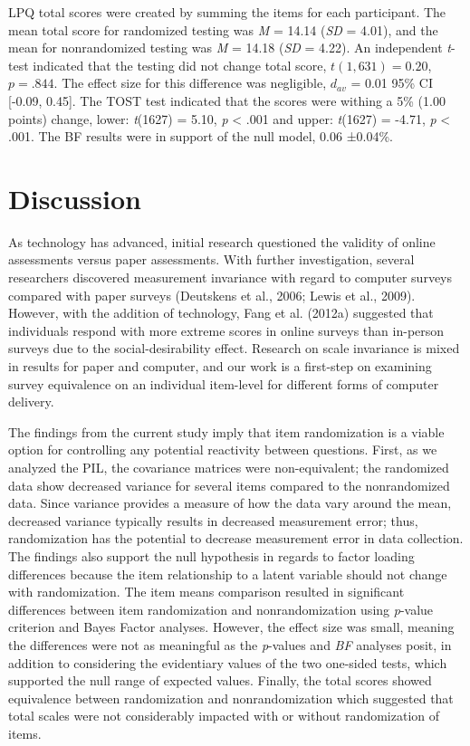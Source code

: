 \documentclass[english,man, mask]{apa6}
\theoremstyle{definition}
\theoremstyle{definition}
\theoremstyle{definition}
\theoremstyle{remark}
\begin{document}
LPQ total scores were created by summing the items for each participant.
The mean total score for randomized testing was \emph{M} = 14.14
(\emph{SD} = 4.01), and the mean for nonrandomized testing was \emph{M}
= 14.18 (\emph{SD} = 4.22). An independent \emph{t}-test indicated that
the testing did not change total score, \(t(1,631) = 0.20\),
\(p = .844\). The effect size for this difference was negligible,
\(d_{av}\) = 0.01 95\% CI {[}-0.09, 0.45{]}. The TOST test indicated
that the scores were withing a 5\% (1.00 points) change, lower:
\emph{t}(1627) = 5.10, \emph{p} \textless{} .001 and upper:
\emph{t}(1627) = -4.71, \emph{p} \textless{} .001. The BF results were
in support of the null model, 0.06 ±0.04\%.

\section{Discussion}\label{discussion}

As technology has advanced, initial research questioned the validity of
online assessments versus paper assessments. With further investigation,
several researchers discovered measurement invariance with regard to
computer surveys compared with paper surveys (Deutskens et al., 2006;
Lewis et al., 2009). However, with the addition of technology, Fang et
al. (2012a) suggested that individuals respond with more extreme scores
in online surveys than in-person surveys due to the social-desirability
effect. Research on scale invariance is mixed in results for paper and
computer, and our work is a first-step on examining survey equivalence
on an individual item-level for different forms of computer delivery.

The findings from the current study imply that item randomization is a
viable option for controlling any potential reactivity between
questions. First, as we analyzed the PIL, the covariance matrices were
non-equivalent; the randomized data show decreased variance for several
items compared to the nonrandomized data. Since variance provides a
measure of how the data vary around the mean, decreased variance
typically results in decreased measurement error; thus, randomization
has the potential to decrease measurement error in data collection. The
findings also support the null hypothesis in regards to factor loading
differences because the item relationship to a latent variable should
not change with randomization. The item means comparison resulted in
significant differences between item randomization and nonrandomization
using \emph{p}-value criterion and Bayes Factor analyses. However, the
effect size was small, meaning the differences were not as meaningful as
the \emph{p}-values and \emph{BF} analyses posit, in addition to
considering the evidentiary values of the two one-sided tests, which
supported the null range of expected values. Finally, the total scores
showed equivalence between randomization and nonrandomization which
suggested that total scales were not considerably impacted with or
without randomization of items.
\end{document}
